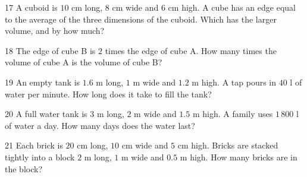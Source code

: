 \gap
\begin{probbox}{17}{\relax}
A cuboid is $10$ cm long, $8$ cm wide and $6$ cm high. A cube has an edge equal to the average of the three dimensions of the cuboid. Which has the larger volume, and by how much?
\end{probbox}
\gap
\begin{probbox}{18}{\relax}
The edge of cube B is $2$ times the edge of cube A. How many times the volume of cube A is the volume of cube B?
\end{probbox}
\gap
\begin{probbox}{19}{\relax}
An empty tank is $1.6$ m long, $1$ m wide and $1.2$ m high. A tap pours in $40$ l of water per minute. How long does it take to fill the tank?
\end{probbox}
\gap
\begin{probbox}{20}{\relax}
A full water tank is $3$ m long, $2$ m wide and $1.5$ m high. A family uses $1\,800$ l of water a day. How many days does the water last?
\end{probbox}
\gap
\begin{probbox}{21}{\relax}
Each brick is $20$ cm long, $10$ cm wide and $5$ cm high. Bricks are stacked tightly into a block $2$ m long, $1$ m wide and $0.5$ m high. How many bricks are in the block?
\end{probbox}
